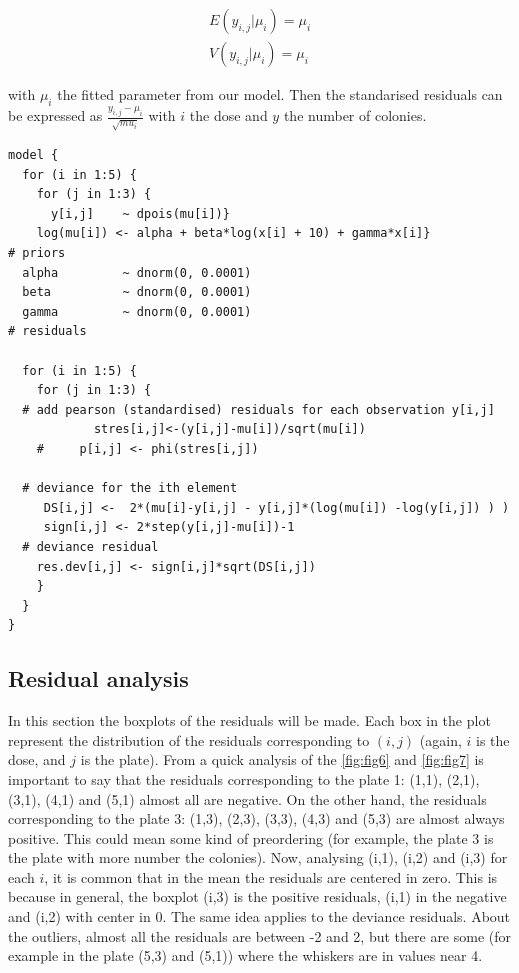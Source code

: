 \documentclass{article}
\begin{document}
\begin{equation}
\begin{aligned}
E(y_{i,j}| \mu_i) = \mu_i \\
V(y_{i,j}| \mu_i) = \mu_i
\end{aligned}
\end{equation}

with $\mu_i$ the fitted parameter from our model. Then the standarised residuals can be expressed as $\frac{y_{i,j}-\mu_i}{\sqrt{mu_i}}$ with $i$ the dose and $y$ the number of colonies.

\newpage
\begin{lstlisting}[frame=single]
model {
  for (i in 1:5) {
    for (j in 1:3) {
      y[i,j]    ~ dpois(mu[i])}
    log(mu[i]) <- alpha + beta*log(x[i] + 10) + gamma*x[i]}
# priors
  alpha         ~ dnorm(0, 0.0001)
  beta          ~ dnorm(0, 0.0001)
  gamma         ~ dnorm(0, 0.0001)
# residuals 
   
  for (i in 1:5) {
    for (j in 1:3) {
  # add pearson (standardised) residuals for each observation y[i,j]
			stres[i,j]<-(y[i,j]-mu[i])/sqrt(mu[i])
	#	  p[i,j] <- phi(stres[i,j])
		
  # deviance for the ith element
     DS[i,j] <-  2*(mu[i]-y[i,j] - y[i,j]*(log(mu[i]) -log(y[i,j]) ) )
     sign[i,j] <- 2*step(y[i,j]-mu[i])-1 
  # deviance residual  
    res.dev[i,j] <- sign[i,j]*sqrt(DS[i,j])
    }
  }     
}
\end{lstlisting}

\subsection{Residual analysis}

In this section the boxplots of the residuals will be made. Each box in the plot represent the distribution of the residuals corresponding to $(i,j)$ (again, $i$ is the dose, and $j$ is the plate). From a quick analysis of the \cref{fig:fig6} and \cref{fig:fig7} is important to say that the residuals corresponding to the plate 1: (1,1), (2,1), (3,1), (4,1) and (5,1) almost  all are negative. On the other hand, the residuals corresponding to the plate 3: (1,3), (2,3), (3,3), (4,3) and (5,3) are almost always positive. This could mean some kind of preordering (for example, the plate 3 is the plate with more number the colonies).  Now, analysing (i,1), (i,2) and (i,3) for each $i$, it is common that in the mean the residuals are centered in zero. This is because in general, the boxplot (i,3) is the positive residuals, (i,1) in the negative and (i,2) with center in 0. The same idea applies to the deviance residuals. About the outliers, almost all the residuals are between -2 and 2, but there are some (for example in the plate (5,3) and (5,1)) where the whiskers are in values near 4.
\end{document}
